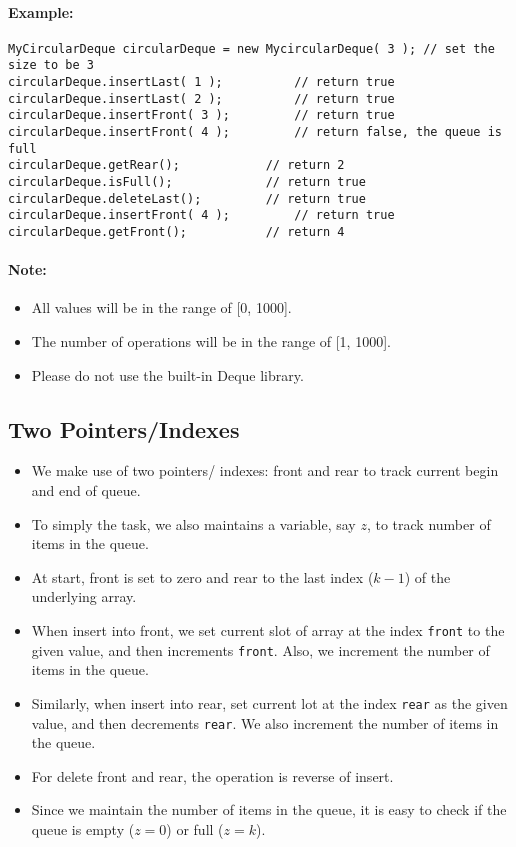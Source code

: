 \paragraph{Example:}

\begin{lstlisting}[style=customc]
MyCircularDeque circularDeque = new MycircularDeque( 3 ); // set the size to be 3
circularDeque.insertLast( 1 );			// return true
circularDeque.insertLast( 2 );			// return true
circularDeque.insertFront( 3 );			// return true
circularDeque.insertFront( 4 );			// return false, the queue is full
circularDeque.getRear();  			// return 2
circularDeque.isFull();				// return true
circularDeque.deleteLast();			// return true
circularDeque.insertFront( 4 );			// return true
circularDeque.getFront();			// return 4
\end{lstlisting}
 

\paragraph{Note:}

\begin{itemize}
\item All values will be in the range of [0, 1000].
\item The number of operations will be in the range of [1, 1000].
\item Please do not use the built-in Deque library.
\end{itemize}

\subsection{Two Pointers/Indexes}
\begin{itemize}
\item We make use of two pointers/ indexes: front and rear to track current begin and end of queue.
\item To simply the task, we also maintains a variable, say $z$, to track number of items in the queue.
\item At start, front is set to zero and rear to the last index ($k-1$) of the underlying array.
\item When insert into front, we set current slot of array at the index \texttt{front} to the given value, and then increments \texttt{front}. Also, we increment the number of items in the queue. 
\item Similarly, when insert into rear, set current lot at the index \texttt{rear} as the given value, and then decrements \texttt{rear}. We also increment the number of items in the queue.
\item For delete front and rear, the operation is reverse of insert. 
\item Since we maintain the number of items in the queue, it is easy to check if the queue is empty ($z=0$) or full ($z=k$).
\end{itemize}
